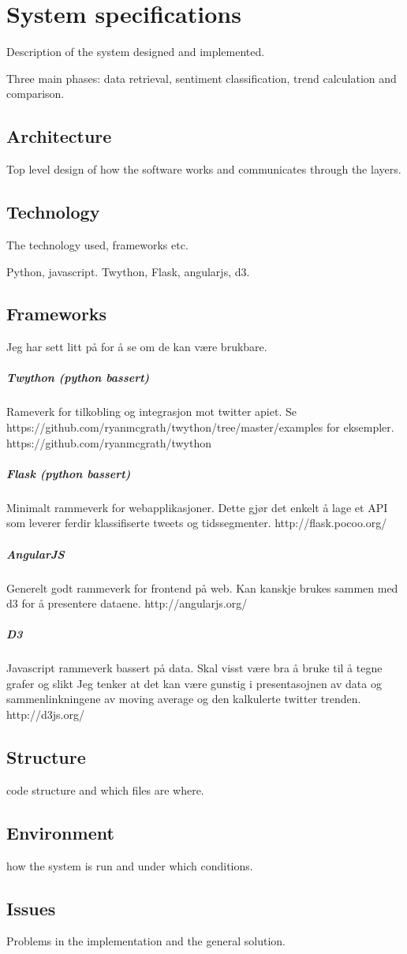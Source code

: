 \chapter{System specifications}
Description of the system designed and implemented. 

Three main phases: data retrieval, sentiment classification, trend calculation
and comparison. 

\section{Architecture}
Top level design of how the software works and communicates through the layers. 
\section{Technology}
The technology used, frameworks etc. 

Python, javascript. 
Twython, Flask, angularjs, d3. 

\section{Frameworks} 
Jeg har sett litt på for å se om de kan være brukbare. 

\paragraph{Twython (python bassert)}
Rameverk for tilkobling og integrasjon mot twitter apiet. 
Se https://github.com/ryanmcgrath/twython/tree/master/examples for eksempler. 
https://github.com/ryanmcgrath/twython

\paragraph{Flask (python bassert)}
Minimalt rammeverk for webapplikasjoner. Dette gjør det enkelt å lage et API som
leverer ferdir klassifiserte tweets og tidssegmenter. 
http://flask.pocoo.org/

\paragraph{AngularJS}
Generelt godt rammeverk for frontend på web. Kan kanskje brukes sammen med d3
for å presentere dataene. 
http://angularjs.org/

\paragraph{D3}
Javascript rammeverk bassert på data. 
Skal visst være bra å bruke til å tegne grafer og slikt
Jeg tenker at det kan være gunstig i presentasojnen av data og sammenlinkningene
av moving average og den kalkulerte twitter trenden. 
http://d3js.org/

\section{Structure}
code structure and which files are where. 
\section{Environment}
how the system is run and under which conditions.
\section{Issues}
Problems in the implementation and the general solution. 
